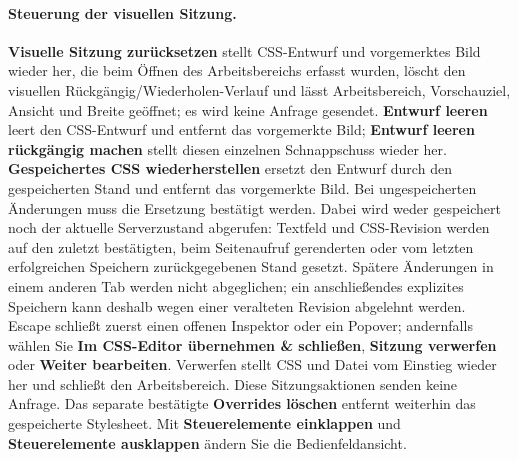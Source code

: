 \documentclass[11pt,a4paper]{article}
\newcommand{\ui}[1]{\textbf{#1}}
\begin{document}
\paragraph{Steuerung der visuellen Sitzung.} \ui{Visuelle Sitzung zurücksetzen}
stellt CSS-Entwurf und vorgemerktes Bild wieder her, die beim Öffnen des
Arbeitsbereichs erfasst wurden, löscht den visuellen
Rückgängig/Wiederholen-Verlauf und lässt Arbeitsbereich, Vorschauziel, Ansicht
und Breite geöffnet; es wird keine Anfrage gesendet. \ui{Entwurf leeren} leert
den CSS-Entwurf und entfernt das vorgemerkte Bild; \ui{Entwurf leeren rückgängig
machen} stellt diesen einzelnen Schnappschuss wieder her. \ui{Gespeichertes CSS
wiederherstellen} ersetzt den Entwurf durch den gespeicherten Stand und entfernt
das vorgemerkte Bild. Bei ungespeicherten Änderungen muss die Ersetzung
bestätigt werden. Dabei wird weder gespeichert noch der aktuelle Serverzustand
abgerufen: Textfeld und CSS-Revision werden auf den zuletzt bestätigten, beim
Seitenaufruf gerenderten oder vom letzten erfolgreichen Speichern
zurückgegebenen Stand gesetzt. Spätere Änderungen in einem anderen Tab werden
nicht abgeglichen; ein anschließendes explizites Speichern kann deshalb wegen
einer veralteten Revision abgelehnt werden. Escape schließt zuerst einen offenen
Inspektor oder ein Popover; andernfalls wählen Sie \ui{Im CSS-Editor übernehmen
\& schließen}, \ui{Sitzung verwerfen} oder \ui{Weiter bearbeiten}. Verwerfen
stellt CSS und Datei vom Einstieg wieder her und schließt den Arbeitsbereich.
Diese Sitzungsaktionen senden keine Anfrage. Das separate bestätigte
\ui{Overrides löschen} entfernt weiterhin das gespeicherte Stylesheet. Mit
\ui{Steuerelemente einklappen} und \ui{Steuerelemente ausklappen} ändern Sie die
Bedienfeldansicht.
\end{document}
